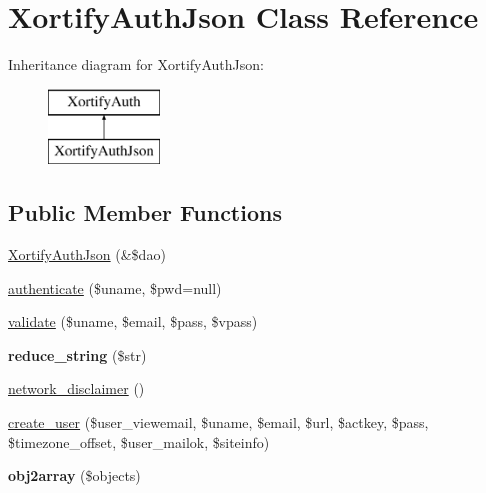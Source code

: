 \hypertarget{class_xortify_auth_json}{\section{Xortify\-Auth\-Json Class Reference}
\label{class_xortify_auth_json}
}
Inheritance diagram for Xortify\-Auth\-Json\-:\begin{figure}[H]
\begin{center}
\leavevmode
\includegraphics[height=2.000000cm]{class_xortify_auth_json}
\end{center}
\end{figure}
\subsection*{Public Member Functions}
\begin{DoxyCompactItemize}
\item 
\hyperlink{class_xortify_auth_json_a5d37b3081d1aec2168b3644252dfb1f9}{Xortify\-Auth\-Json} (\&\$dao)
\item 
\hyperlink{class_xortify_auth_json_a710223f3d580f2e8bcba989922954b40}{authenticate} (\$uname, \$pwd=null)
\item 
\hyperlink{class_xortify_auth_json_a01fd9d2ea6bb93d685fe443abe5bbbf9}{validate} (\$uname, \$email, \$pass, \$vpass)
\item 
\hypertarget{class_xortify_auth_json_a5f75f7e06b66c2eaf72f7f0ce1a2341d}{{\bfseries reduce\-\_\-string} (\$str)}\label{class_xortify_auth_json_a5f75f7e06b66c2eaf72f7f0ce1a2341d}

\item 
\hyperlink{class_xortify_auth_json_a4c77bb2f01a3a48346b20b4e90419429}{network\-\_\-disclaimer} ()
\item 
\hyperlink{class_xortify_auth_json_a9165edbba0fe116776a01eb2c3dc533a}{create\-\_\-user} (\$user\-\_\-viewemail, \$uname, \$email, \$url, \$actkey, \$pass, \$timezone\-\_\-offset, \$user\-\_\-mailok, \$siteinfo)
\item 
\hypertarget{class_xortify_auth_json_a97e101addc8dd12ca0e7aa8a807ea5ba}{{\bfseries obj2array} (\$objects)}\label{class_xortify_auth_json_a97e101addc8dd12ca0e7aa8a807ea5ba}

\end{DoxyCompactItemize}
